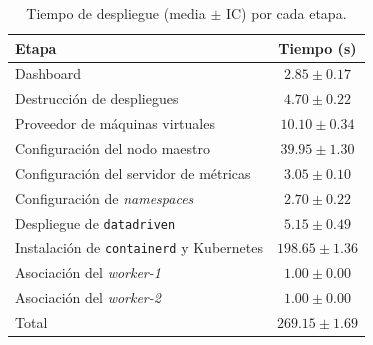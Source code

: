\begin{table}[ht!]
\centering
\begin{tabular}{|l|c|}
\hline
\textbf{Etapa} & \textbf{Tiempo (s)} \\
\hline
Dashboard & $2.85 \pm 0.17$ \\ \hline
Destrucción de despliegues & $4.70 \pm 0.22$ \\ \hline
Proveedor de máquinas virtuales & $10.10 \pm 0.34$ \\ \hline
Configuración del nodo maestro & $39.95 \pm 1.30$ \\ \hline
Configuración del servidor de métricas & $3.05 \pm 0.10$ \\ \hline
Configuración de \textit{namespaces} & $2.70 \pm 0.22$ \\ \hline
Despliegue de \texttt{datadriven} & $5.15 \pm 0.49$ \\ \hline
Instalación de \texttt{containerd} y Kubernetes & $198.65 \pm 1.36$ \\ \hline
Asociación del \textit{worker-1} & $1.00 \pm 0.00$ \\ \hline
Asociación del \textit{worker-2} & $1.00 \pm 0.00$ \\ \hline
Total & $269.15 \pm 1.69$ \\
\hline
\end{tabular}
\caption{Tiempo de despliegue (media $\pm$ IC) por cada etapa.}
\label{tab:deployment-times}
\end{table}

